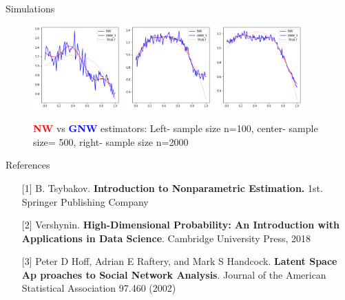 \documentclass[final,dvipsnames]{beamer}
\makeatletter
\newcommand{\myemphh}[1]{\textbf{\textcolor{blue}{#1}}}
\newcommand{\myemphr}[1]{\textbf{\textcolor{red}{#1}}}
\newcommand*{\rom}[1]{\expandafter\@slowromancap\romannumeral #1@}
\makeatother
\begin{document}
\begin{frame}
\begin{columns}[T]
\begin{column}{0.49\textwidth}
\begin{block}{Simulations
    
    \hspace*{\fill}{\large{\rom{6}}\qquad}}
    
    \begin{figure}
        \centering
        \includegraphics[width=0.3\textwidth]{trueSMALLsample.png}
        \includegraphics[width=0.3\textwidth]{trueMEDsample.png}
        \includegraphics[width=0.3\textwidth]{trueLARGEsample.png}
        \caption{\myemphr{NW} vs \myemphh{GNW} estimators: Left- sample size n=100, center- sample size= 500, right- sample size n=2000}
    \end{figure}
    
\end{block}



\begin{block}{References}
    {\footnotesize
    \begin{itemize}
    \item[{[1]}] B. Tsybakov. \textbf{Introduction to Nonparametric Estimation.} 1st.
    Springer Publishing Company
    \item[{[2]}] Vershynin. \textbf{High-Dimensional Probability: An Introduction with Applications in Data Science}. Cambridge University Press, 2018
    \item[{[3]}] Peter D Hoff, Adrian E Raftery, and Mark S Handcock. \textbf{Latent Space Ap
    proaches to Social Network Analysis}. Journal of the American Statistical
    Association 97.460 (2002)
    \end{itemize}
    }
\end{block}
\end{column}
\end{columns}
\end{frame}
\end{document}
